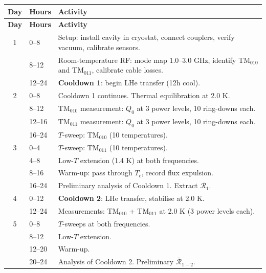 \documentclass[11pt]{article}
\theoremstyle{definition}
\theoremstyle{remark}
\begin{document}
\begin{tcolorbox}[colback=white, colframe=black,
  title=\textbf{14-DAY CAMPAIGN SCHEDULE}, breakable]

\renewcommand{\arraystretch}{1.2}
\begin{longtable}{@{}clp{8cm}@{}}
\toprule
\textbf{Day} & \textbf{Hours} & \textbf{Activity} \\
\midrule
\endfirsthead
\midrule
\textbf{Day} & \textbf{Hours} & \textbf{Activity} \\
\midrule
\endhead

1 & 0--8 & Setup: install cavity in cryostat, connect couplers,
  verify vacuum, calibrate sensors. \\
  & 8--12 & Room-temperature RF: mode map 1.0--3.0 GHz, identify
  TM$_{010}$ and TM$_{011}$, calibrate cable losses. \\
  & 12--24 & \textbf{Cooldown 1}: begin LHe transfer (12h cool). \\

\midrule
2 & 0--8 & Cooldown 1 continues. Thermal equilibration at 2.0 K. \\
  & 8--12 & TM$_{010}$ measurement: $Q_0$ at 3 power levels,
  10 ring-downs each. \\
  & 12--16 & TM$_{011}$ measurement: $Q_0$ at 3 power levels,
  10 ring-downs each. \\
  & 16--24 & $T$-sweep: TM$_{010}$ (10 temperatures). \\

\midrule
3 & 0--4 & $T$-sweep: TM$_{011}$ (10 temperatures). \\
  & 4--8 & Low-$T$ extension (1.4 K) at both frequencies. \\
  & 8--16 & Warm-up: pass through $T_c$, record flux expulsion. \\
  & 16--24 & Preliminary analysis of Cooldown 1. Extract
  $\mathcal{R}_1$. \\

\midrule
4 & 0--12 & \textbf{Cooldown 2}: LHe transfer, stabilise at 2.0 K. \\
  & 12--24 & Measurements: TM$_{010}$ + TM$_{011}$ at 2.0 K
  (3 power levels each). \\

\midrule
5 & 0--8 & $T$-sweeps at both frequencies. \\
  & 8--12 & Low-$T$ extension. \\
  & 12--20 & Warm-up. \\
  & 20--24 & Analysis of Cooldown 2. Preliminary
  $\bar{\mathcal{R}}_{1-2}$. \\


\end{longtable}
\end{tcolorbox}
\end{document}
